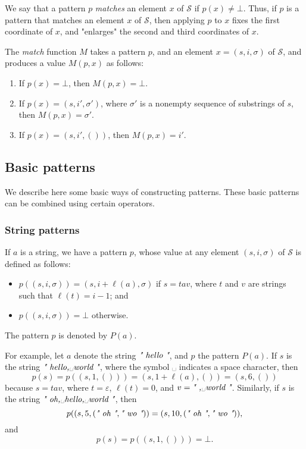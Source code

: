 \documentclass{article}
\begin{document}
We say that a pattern \(p\) \emph{matches} an element \(x\) of
\(\mathcal{S}\) if \(p(x) \neq \bot\).  Thus, if \(p\) is a pattern
that matches an element \(x\) of \(\mathcal{S}\), then applying \(p\)
to \(x\) fixes the first coordinate of \(x\), and "enlarges" the
second and third coordinates of \(x\).

The \emph{match} function \(M\) takes a pattern \(p\), and an
element \(x = (s, i, \sigma)\) of \(\mathcal{S}\), and produces a
value \(M(p, x)\) as follows:
\begin{enumerate}
\item If \(p(x) = \bot\), then \(M(p, x) = \bot\).
\item If \(p(x) = (s, i', \sigma')\), where \(\sigma'\) is a nonempty
  sequence of substrings of \(s\), then \(M(p, x) = \sigma'\).
\item If \(p(x) = (s, i', ())\), then \(M(p, x) = i'\).
\end{enumerate}

\subsection{Basic patterns}
\label{sec:2ynr2sf4}

We describe here some basic ways of constructing patterns.  These
basic patterns can be combined using certain operators.

\subsubsection{String patterns}
\label{sec:zn6czomy}

If \(a\) is a string, we have a pattern \(p\), whose value at any
element \((s, i, \sigma)\) of \(\mathcal{S}\) is defined as follows:
\begin{itemize}
\item \(p((s, i, \sigma)) = (s, i + \ell(a), \sigma)\) if \(s = tav\),
  where \(t\) and \(v\) are strings such that \(\ell(t) = i - 1\); and
\item \(p((s, i, \sigma)) = \bot\) otherwise.
\end{itemize}
The pattern \(p\) is denoted by \(P(a)\).

For example, let \(a\) denote the string \(\text{\itshape" hello "}\), and \(p\)
the pattern \(P(a)\).  If \(s\) is the string \(\text{\itshape" hello,␣world "}\),
where the symbol ␣ indicates a space character, then
\begin{displaymath}
  p(s) =
  p((s, 1, ())) =
  (s, 1 + \ell(a), ()) =
  (s, 6, ())
\end{displaymath}
because \(s = tav\), where \(t = \varepsilon\), \(\ell(t) = 0\), and
\(v = \text{\itshape" ,␣world "}\).  Similarly, if \(s\) is the string
\(\text{\itshape" oh,␣hello,␣world "}\), then
\begin{displaymath}
  p((s, 5, (\text{\itshape" oh "}, \text{\itshape" wo "})) = (s, 10, (\text{\itshape" oh "}, \text{\itshape" wo "})),
\end{displaymath}
and
\begin{displaymath}
  p(s) = p((s, 1, ())) = \bot.
\end{displaymath}
\end{document}
